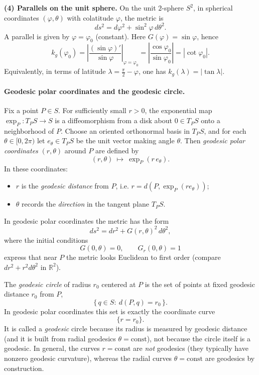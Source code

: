\documentclass[12pt,a4paper]{article}
\theoremstyle{plain}
\theoremstyle{definition}      %
\begin{document}
\medskip
\noindent\textbf{(4) Parallels on the unit sphere.}
On the unit \(2\)-sphere \(S^{2}\), in spherical coordinates \((\varphi,\theta)\) with colatitude
\(\varphi\), the metric is
\[
ds^{2}=d\varphi^{2}+\sin^{2}\varphi\,d\theta^{2}.
\]
A parallel is given by \(\varphi=\varphi_{0}\) (constant). Here \(G(\varphi)=\sin\varphi\), hence
\[
k_{g}(\varphi_{0})=\left|\frac{(\sin\varphi)'}{\sin\varphi}\right|_{\varphi=\varphi_{0}}
=\left|\frac{\cos\varphi_{0}}{\sin\varphi_{0}}\right|
=|\cot\varphi_{0}|.
\]
Equivalently, in terms of latitude \(\lambda=\frac{\pi}{2}-\varphi\), one has \(k_{g}(\lambda)=|\tan\lambda|\).

\paragraph{Geodesic polar coordinates and the geodesic circle.}
Fix a point \(P\in S\). For sufficiently small \(r>0\), the exponential map
\(\exp_{P}\colon T_{P}S\to S\) is a diffeomorphism from a disk about \(0\in T_{P}S\) onto a
neighborhood of \(P\). Choose an oriented orthonormal basis in \(T_{P}S\), and for each
\(\theta\in[0,2\pi)\) let \(e_{\theta}\in T_{P}S\) be the unit vector making angle \(\theta\).
Then \emph{geodesic polar coordinates} \((r,\theta)\) around \(P\) are defined by
\[
(r,\theta)\ \longmapsto\ \exp_{P}(r\,e_{\theta}).
\]
In these coordinates:
\begin{itemize}
	\item \(r\) is the \emph{geodesic distance} from \(P\), i.e. \(r=d(P,\exp_{P}(r e_{\theta}))\);
	\item \(\theta\) records the \emph{direction} in the tangent plane \(T_{P}S\).
\end{itemize}

In geodesic polar coordinates the metric has the form
\[
ds^{2}=dr^{2}+G(r,\theta)^{2}\,d\theta^{2},
\]
where the initial conditions
\[
G(0,\theta)=0,\qquad G_{r}(0,\theta)=1
\]
express that near \(P\) the metric looks Euclidean to first order (compare \(dr^{2}+r^{2}d\theta^{2}\) in
\(\mathbb{R}^{2}\)).

\medskip
\noindent The \emph{geodesic circle} of radius \(r_{0}\) centered at \(P\) is the set of points at
fixed geodesic distance \(r_{0}\) from \(P\),
\[
\{\,q\in S:\ d(P,q)=r_{0}\,\}.
\]
In geodesic polar coordinates this set is exactly the coordinate curve
\[
\{r=r_{0}\}.
\]
It is called a \emph{geodesic} circle because its radius is measured by geodesic distance (and it is
built from radial geodesics \(\theta=\mathrm{const}\)), not because the circle itself is a geodesic.
In general, the curves \(r=\mathrm{const}\) are \emph{not} geodesics (they typically have nonzero
geodesic curvature), whereas the radial curves \(\theta=\mathrm{const}\) are geodesics by construction.
\end{document}
